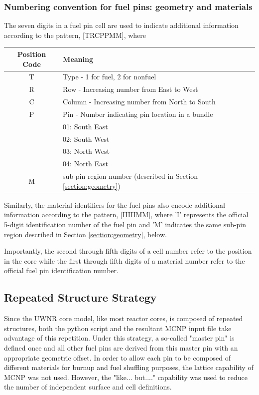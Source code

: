 \documentclass{UWNR_modeling}
\begin{document}
\subsubsection{Numbering convention for fuel pins: geometry and materials}

The seven digits in a fuel pin cell are used to indicate additional information according to the pattern, 
[TRCPPMM], where

\begin{tabular}{|c|l|}
\hline
Position Code & Meaning \\\hline
T & Type     - 1 for fuel, 2 for nonfuel\\
R & Row      - Increasing number from East to West\\
C & Column   - Increasing number from North to South\\
P & Pin      - Number indicating pin location in a bundle\\
 & 01: South East\\
 & 02: South West\\
 & 03: North West\\
 & 04: North East\\
M & sub-pin region number (described in Section \ref{section:geometry})\\\hline
\end{tabular}

Similarly, the material identifiers for the fuel pins also encode additional information according to the pattern,
[IIIIIMM], where 'I' represents the official 5-digit identification number of the fuel pin and 'M' indicates the same sub-pin region described in Section \ref{section:geometry}, below.

Importantly, the second through fifth digits of a cell number refer to the position in the core while the first through fifth digits of a material number refer to the official fuel pin identification number.

\subsection{Repeated Structure Strategy}

Since the UWNR core model, like most reactor cores, is composed of repeated structures, both the python script and the resultant MCNP input file take advantage of this repetition.  Under this strategy, a so-called "master pin" is defined once and all other fuel pins are derived from this master pin with an appropriate geometric offset.  In order to allow each pin to be composed of different materials for burnup and fuel shuffling purposes, the lattice capability of MCNP was not used.  However, the "like... but...." capability was used to reduce the number of independent surface and cell definitions.
\end{document}
